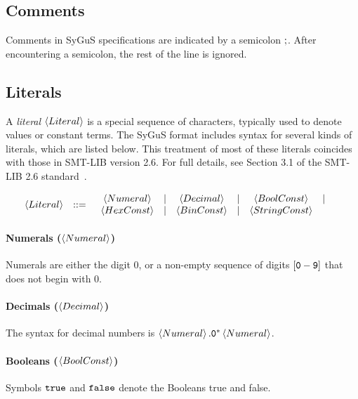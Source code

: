 \documentclass[english,a4paper,10pt]{article}
\begin{document}
\subsection{Comments}

Comments in SyGuS specifications are indicated by a semicolon ${\tt ;}$.
After encountering a semicolon, the rest of the line is ignored.

\subsection{Literals}
\label{ssec:literals}

A \emph{literal} $\left\langle Literal\right\rangle$ is a special sequence of characters,
typically used to denote values or constant terms.
The SyGuS format includes syntax for several kinds of literals,
which are listed below.
This treatment of most of these literals coincides with
those in SMT-LIB version 2.6.
For full details, see Section 3.1 of the SMT-LIB 2.6 standard~\cite{BarFT-RR-17}.

\begin{alignat*}{1}
 & \begin{array}{rcl}
\left\langle Literal\right\rangle & ::= & \begin{array}{ccccccccccc}
\left\langle Numeral\right\rangle & | & \left\langle Decimal\right\rangle & | & \left\langle BoolConst\right\rangle & | \\
\left\langle HexConst\right\rangle & | & \left\langle BinConst\right\rangle & | & \left\langle StringConst\right\rangle\end{array}\\
\end{array}
\end{alignat*}

\paragraph{Numerals ($\left\langle Numeral\right\rangle$)}
Numerals are
either the digit $0$,
or a non-empty sequence of digits $\left[{\tt 0}-{\tt 9}\right]$
that does not begin with $0$.

\paragraph{Decimals ($\left\langle Decimal\right\rangle$)}
The syntax for decimal numbers is $\left\langle Numeral\right\rangle{\tt .0^{*}}\left\langle Numeral\right\rangle$.

\paragraph{Booleans ($\left\langle BoolConst\right\rangle$)}
Symbols $\texttt{true}$ and $\texttt{false}$ denote the Booleans true and false.
\end{document}
